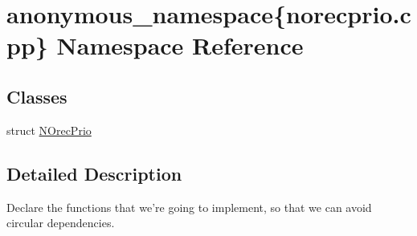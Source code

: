 \hypertarget{namespaceanonymous__namespace_02norecprio_8cpp_03}{\section{anonymous\-\_\-namespace\{norecprio.\-cpp\} Namespace Reference}
\label{namespaceanonymous__namespace_02norecprio_8cpp_03}
}
\subsection*{Classes}
\begin{DoxyCompactItemize}
\item 
struct \hyperlink{structanonymous__namespace_02norecprio_8cpp_03_1_1NOrecPrio}{N\-Orec\-Prio}
\end{DoxyCompactItemize}


\subsection{Detailed Description}
Declare the functions that we're going to implement, so that we can avoid circular dependencies. 